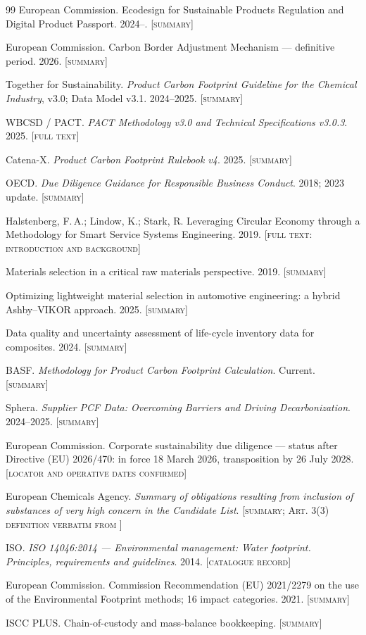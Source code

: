 \documentclass[10pt,twocolumn,a4paper]{article}
\newcommand{\ev}[1]{{\footnotesize\textsc{#1}}}
\begin{document}
\begin{thebibliography}{99}
 European Commission. Ecodesign for Sustainable Products Regulation
and Digital Product Passport. 2024--. \ev{[summary]}

 European Commission. Carbon Border Adjustment Mechanism ---
definitive period. 2026. \ev{[summary]}

 Together for Sustainability. \emph{Product Carbon Footprint
Guideline for the Chemical Industry}, v3.0; Data Model v3.1. 2024--2025. \ev{[summary]}

 WBCSD / PACT. \emph{PACT Methodology v3.0 and Technical
Specifications v3.0.3}. 2025. \ev{[full text]}

 Catena-X. \emph{Product Carbon Footprint Rulebook v4}. 2025. \ev{[summary]}

 OECD. \emph{Due Diligence Guidance for Responsible Business
Conduct}. 2018; 2023 update. \ev{[summary]}

 Halstenberg, F.\,A.; Lindow, K.; Stark, R. Leveraging Circular
Economy through a Methodology for Smart Service Systems Engineering. 2019.
\ev{[full text: introduction and background]}

 Materials selection in a critical raw materials perspective. 2019. \ev{[summary]}

 Optimizing lightweight material selection in automotive
engineering: a hybrid Ashby--VIKOR approach. 2025. \ev{[summary]}

 Data quality and uncertainty assessment of life-cycle inventory data
for composites. 2024. \ev{[summary]}

 BASF. \emph{Methodology for Product Carbon Footprint Calculation}.
Current. \ev{[summary]}

 Sphera. \emph{Supplier PCF Data: Overcoming Barriers and Driving
Decarbonization}. 2024--2025. \ev{[summary]}

 European Commission. Corporate sustainability due diligence ---
status after Directive (EU) 2026/470: in force 18 March 2026, transposition by
26 July 2028. \ev{[locator and operative dates confirmed]}

 European Chemicals Agency. \emph{Summary of obligations resulting
from inclusion of substances of very high concern in the Candidate List}.
\ev{[summary; Art. 3(3) definition verbatim from \cite{p4}]}

 ISO. \emph{ISO 14046:2014 --- Environmental management: Water
footprint. Principles, requirements and guidelines}. 2014. \ev{[catalogue record]}

 European Commission. Commission Recommendation (EU) 2021/2279 on the
use of the Environmental Footprint methods; 16 impact categories. 2021. \ev{[summary]}

 ISCC PLUS. Chain-of-custody and mass-balance bookkeeping.
\ev{[summary]}

\end{thebibliography}
\end{document}
